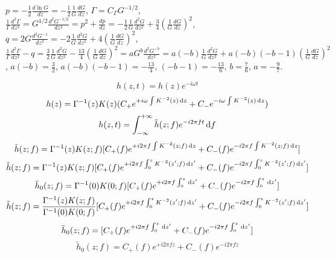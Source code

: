 $p=-\frac{1}{2}\frac{d\ln G}{dz}=-\frac{1}{2}\frac{1}{G}\frac{dG}{dz}$, $\Gamma=C_{\Gamma} G^{-1/2}$, $\frac{1}{\Gamma}\frac{d^2\Gamma}{dz^2}=G^{1/2}\frac{d^2G^{-1/2}}{dz^2}=p^2+\frac{dp}{dz}=-\frac{1}{2}\frac{1}{G}\frac{d^2G}{dz^2}+\frac{3}{4}\left(\frac{1}{G}\frac{dG}{dz}\right)^2$, $q=2G\frac{d^2G^{-1}}{dz^2}=-2\frac{1}{G}\frac{d^2G}{dz^2}+4\left(\frac{1}{G}\frac{dG}{dz}\right)^2$, $\frac{1}{\Gamma}\frac{d^2\Gamma}{dz^2}-q=\frac{3}{2}\frac{1}{G}\frac{d^2G}{dz^2}-\frac{13}{4}\left(\frac{1}{G}\frac{dG}{dz}\right)^2=aG^b\frac{d^2G^{-b}}{dz^2}=a(-b)\frac{1}{G}\frac{d^2G}{dz^2}+a(-b)(-b-1)\left(\frac{1}{G}\frac{dG}{dz}\right)^2$, $a(-b)=\frac{3}{2}$, $a(-b)(-b-1)=-\frac{13}{4}$, $(-b-1)=-\frac{13}{6}$, $b=\frac{7}{6}$, $a=-\frac{9}{7}$.

\begin{equation}
    h(z,t)=h(z)e^{-i\omega t}
\end{equation}
\begin{equation}
    h(z)=\Gamma^{-1}(z)K(z)(C_+e^{+i\omega\int K^{-2}(z)\,\mathrm{d} z}+C_-e^{-i\omega\int K^{-2}(z)\,\mathrm{d} z})
\end{equation}
\begin{equation}
    h(z,t)=\int_{-\infty}^{+\infty}\tilde{h}(z;f)e^{-i2\pi f t}\,\mathrm{d} f
\end{equation}
\begin{equation}
    \tilde{h}(z;f)=\Gamma^{-1}(z)K(z;f)[C_+(f)e^{+i2\pi f\int K^{-2}(z;f)\,\mathrm{d} z}+C_-(f)e^{-i2\pi f\int K^{-2}(z;f)\,\mathrm{d} z}]
\end{equation}
\begin{equation}
    \tilde{h}(z;f)=\Gamma^{-1}(z)K(z;f)[C_+(f)e^{+i2\pi f\int_0^z K^{-2}(z';f)\,\mathrm{d} z'}+C_-(f)e^{-i2\pi f\int_0^z K^{-2}(z';f)\,\mathrm{d} z'}]
\end{equation}
\begin{equation}
    \tilde{h}_0(z;f)=\Gamma^{-1}(0)K(0;f)[C_+(f)e^{+i2\pi f\int_0^z\,\mathrm{d} z'}+C_-(f)e^{-i2\pi f\int_0^z\,\mathrm{d} z'}]
\end{equation}
\begin{equation}
    \tilde{h}(z;f)=\frac{\Gamma^{-1}(z)K(z;f)}{\Gamma^{-1}(0)K(0;f)}[C_+(f)e^{+i2\pi f\int_0^z K^{-2}(z';f)\,\mathrm{d} z'}+C_-(f)e^{-i2\pi f\int_0^z K^{-2}(z';f)\,\mathrm{d} z'}]
\end{equation}
\begin{equation}
    \tilde{h}_0(z;f)=[C_+(f)e^{+i2\pi f\int_0^z\,\mathrm{d} z'}+C_-(f)e^{-i2\pi f\int_0^z\,\mathrm{d} z'}]
\end{equation}
\begin{equation}
    \tilde{h}_0(z;f)=C_+(f)e^{+i2\pi fz}+C_-(f)e^{-i2\pi fz}
\end{equation}
